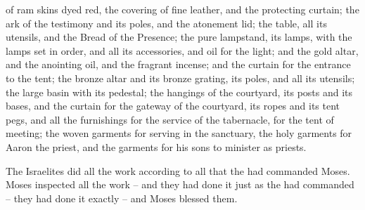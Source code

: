 {of ram
skins
dyed red,
the covering
of fine
leather,
and the protecting
curtain;
the ark
of the testimony
and its
poles,
and the atonement lid;
the table,
all
its utensils,
and the Bread
of the Presence;
the pure
lampstand,
its
lamps,
with the lamps
set in order,
and all
its accessories,
and oil
for the light;
and the
gold
altar,
and the
anointing
oil,
and the
fragrant
incense;
and the curtain
for the entrance
to the tent;
the bronze
altar
and its
bronze
grating,
its
poles,
and all
its utensils;
the large basin
with its
pedestal;
the
hangings
of the courtyard,
its posts
and its bases,
and the
curtain
for the gateway
of the courtyard,
its ropes
and its tent pegs,
and all
the furnishings
for the service
of the tabernacle,
for the tent
of meeting;
the woven
garments
for serving
in the sanctuary,
the holy
garments
for Aaron
the priest,
and the garments
for his sons
to minister as priests.
\par }{\PP {}The Israelites
did
all
the work
according to all
that
the {}
had commanded
Moses.
Moses
inspected
all
the work
– and they had done
it just
as the
{}
had commanded
– they had done
it exactly
– and Moses
blessed them.

}
